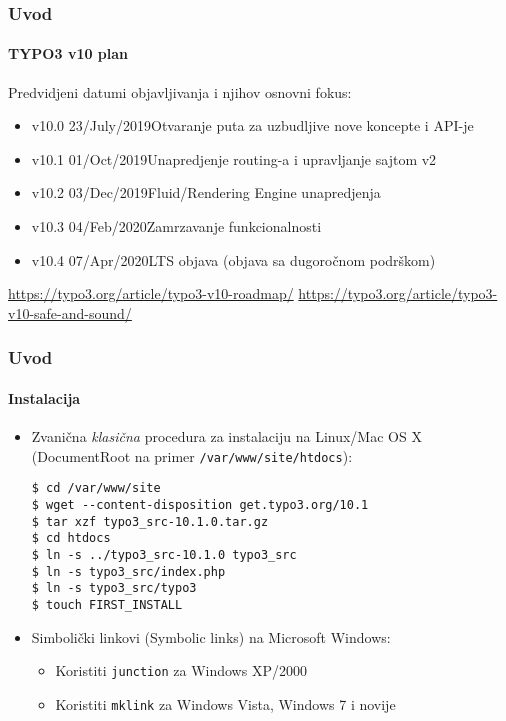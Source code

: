 
\begin{frame}[fragile]
	\frametitle{Uvod}
	\framesubtitle{TYPO3 v10 plan}

	Predvidjeni datumi objavljivanja i njihov osnovni fokus:

	\begin{itemize}

		\item v10.0 \tabto{1.1cm}23/July/2019\tabto{3.4cm}Otvaranje puta za uzbudljive nove koncepte i API-je
		\item
			\begingroup
				\color{typo3orange}
				v10.1 \tabto{1.1cm}01/Oct/2019\tabto{3.4cm}Unapredjenje routing-a i upravljanje sajtom v2
			\endgroup
		\item v10.2 \tabto{1.1cm}03/Dec/2019\tabto{3.4cm}Fluid/Rendering Engine unapredjenja
		\item v10.3 \tabto{1.1cm}04/Feb/2020\tabto{3.4cm}Zamrzavanje funkcionalnosti
		\item v10.4 \tabto{1.1cm}07/Apr/2020\tabto{3.4cm}LTS objava (objava sa dugoročnom podrškom)

	\end{itemize}

	\smaller
		\url{https://typo3.org/article/typo3-v10-roadmap/}\newline
		\url{https://typo3.org/article/typo3-v10-safe-and-sound/}
	\normalsize

\end{frame}


\begin{frame}[fragile]
	\frametitle{Uvod}
	\framesubtitle{Instalacija}

	\begin{itemize}
		\item Zvanična \textit{klasična} procedura za instalaciju na Linux/Mac OS X\newline
			(DocumentRoot na primer \texttt{/var/www/site/htdocs}):
		\begin{lstlisting}
$ cd /var/www/site
$ wget --content-disposition get.typo3.org/10.1
$ tar xzf typo3_src-10.1.0.tar.gz
$ cd htdocs
$ ln -s ../typo3_src-10.1.0 typo3_src
$ ln -s typo3_src/index.php
$ ln -s typo3_src/typo3
$ touch FIRST_INSTALL
		\end{lstlisting}

		\item Simbolički linkovi (Symbolic links) na Microsoft Windows:

			\begin{itemize}
				\item Koristiti \texttt{junction} za Windows XP/2000
				\item Koristiti \texttt{mklink} za Windows Vista, Windows 7 i novije
			\end{itemize}

	\end{itemize}
\end{frame}

